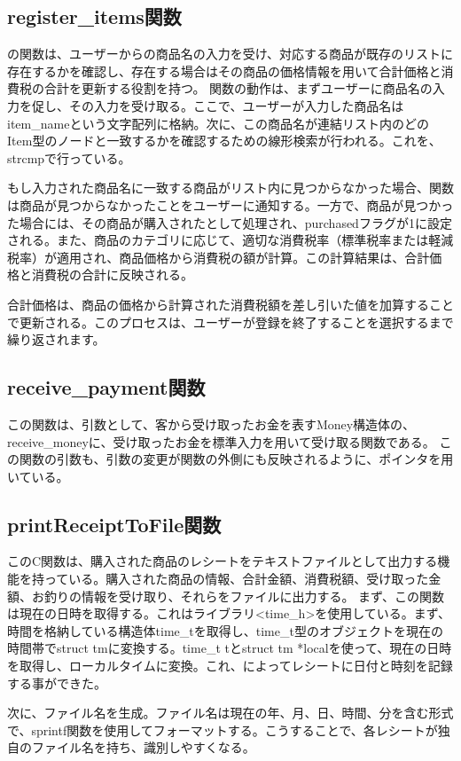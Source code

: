\documentclass[a4j,11pt]{jarticle}
\begin{document}
\subsection{register\_items関数}
の関数は、ユーザーからの商品名の入力を受け、対応する商品が既存のリストに存在するかを確認し、存在する場合はその商品の価格情報を用いて合計価格と消費税の合計を更新する役割を持つ。
関数の動作は、まずユーザーに商品名の入力を促し、その入力を受け取る。ここで、ユーザーが入力した商品名はitem\_nameという文字配列に格納。次に、この商品名が連結リスト内のどのItem型のノードと一致するかを確認するための線形検索が行われる。これを、strcmpで行っている。

もし入力された商品名に一致する商品がリスト内に見つからなかった場合、関数は商品が見つからなかったことをユーザーに通知する。一方で、商品が見つかった場合には、その商品が購入されたとして処理され、purchasedフラグが1に設定される。また、商品のカテゴリに応じて、適切な消費税率（標準税率または軽減税率）が適用され、商品価格から消費税の額が計算。この計算結果は、合計価格と消費税の合計に反映される。

合計価格は、商品の価格から計算された消費税額を差し引いた値を加算することで更新される。このプロセスは、ユーザーが登録を終了することを選択するまで繰り返されます。
\subsection{receive\_payment関数}
この関数は、引数として、客から受け取ったお金を表すMoney構造体の、receive\_moneyに、受け取ったお金を標準入力を用いて受け取る関数である。
この関数の引数も、引数の変更が関数の外側にも反映されるように、ポインタを用いている。
\subsection{printReceiptToFile関数}
このC関数は、購入された商品のレシートをテキストファイルとして出力する機能を持っている。購入された商品の情報、合計金額、消費税額、受け取った金額、お釣りの情報を受け取り、それらをファイルに出力する。
まず、この関数は現在の日時を取得する。これはライブラリ<time\_h>を使用している。まず、時間を格納している構造体time\_tを取得し、time\_t型のオブジェクトを現在の時間帯でstruct tmに変換する。time\_t tとstruct tm *localを使って、現在の日時を取得し、ローカルタイムに変換。これ、によってレシートに日付と時刻を記録する事ができた。

次に、ファイル名を生成。ファイル名は現在の年、月、日、時間、分を含む形式で、sprintf関数を使用してフォーマットする。こうすることで、各レシートが独自のファイル名を持ち、識別しやすくなる。
\end{document}
